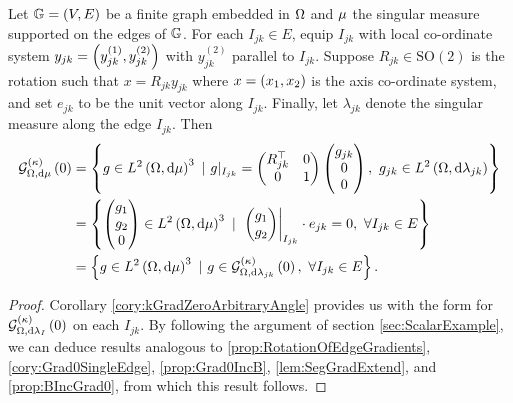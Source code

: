 \begin{cory} \label{cory:CharacterisationkGradientsZero}
	Let $\mathbb{G}=\left( V,E \right)$ be a finite graph embedded in $\Omega$ and $\mu$ the singular measure supported on the edges of $\mathbb{G}$.
	For each $I_{jk}\in E$, equip $I_{jk}$ with local co-ordinate system $y_{jk} = \left( y_{jk}^{(1)},y_{jk}^{(2)} \right)$ with $y_{jk}^{(2)}$ parallel to $I_{jk}$.
	Suppose $R_{jk}\in\mathrm{SO}(2)$ is the rotation such that $x=R_{jk}y_{jk}$ where $x=\left( x_1,x_2 \right)$ is the axis co-ordinate system, and set $e_{jk}$ to be the unit vector along $I_{jk}$.
	Finally, let $\lambda_{jk}$ denote the singular measure along the edge $I_{jk}$.
	Then
	\begin{align*}
		\kgradZero{\ddom}{\ddmes} &= 
		\clbracs{ 
		g\in\ltwo{\ddom}{\ddmes}^3 \ \vert \
		g\vert_{I_{jk}} = \begin{pmatrix} R_{jk}^{\top} & 0 \\ 0 & 1 \end{pmatrix} \begin{pmatrix} g_{jk} \\ 0 \\ 0 \end{pmatrix}, \ g_{jk}\in\ltwo{\ddom}{\lambda_{jk}}
		} \\
		&=
		\clbracs{ 
		\begin{pmatrix} g_1 \\ g_2 \\ 0 \end{pmatrix}		
		\in\ltwo{\ddom}{\ddmes}^3 \ \vert \ \left.
		\begin{pmatrix} g_1 \\ g_2 \end{pmatrix}
		\right\rvert_{I_{jk}}\cdot e_{jk} = 0, \ \forall I_{jk}\in E 
		} \\
		&= \clbracs{ g\in\ltwo{\ddom}{\ddmes}^3 \ \vert \ g\in\kgradZero{\ddom}{\lambda_{jk}}, \ \forall I_{jk}\in E }.
	\end{align*}
\end{cory}
\begin{proof}
	Corollary \ref{cory:kGradZeroArbitraryAngle} provides us with the form for $\mathcal{G}_{ \Omega, \mathrm{d}\lambda_I}^{(\kappa)}\left( 0 \right)$ on each $I_{jk}$.
	By following the argument of section \ref{sec:ScalarExample}, we can deduce results analogous to \ref{prop:RotationOfEdgeGradients}, \ref{cory:Grad0SingleEdge}, \ref{prop:Grad0IncB}, \ref{lem:SegGradExtend}, and \ref{prop:BIncGrad0}, from which this result follows.
\end{proof}

